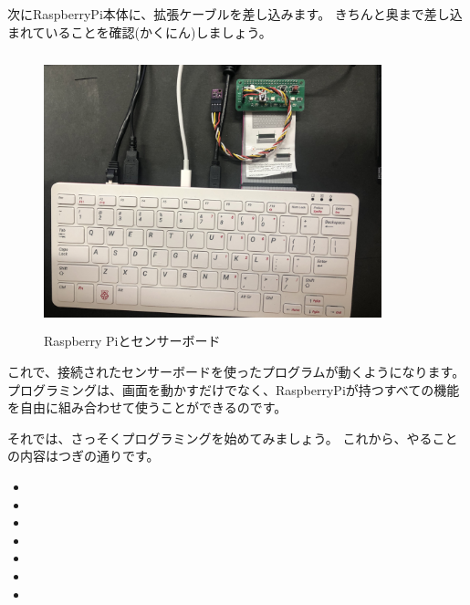 次にRaspberryPi本体に、拡張ケーブルを差し込みます。
きちんと奥まで差し込まれていることを確認(かくにん)しましょう。

\begin{figure}[H]
    \begin{center}
        \includegraphics[keepaspectratio,width=9.79cm,height=7.955cm]{text02-img/sensor4.jpg}
        \caption{Raspberry Piとセンサーボード}
    \end{center}
\end{figure}

これで、接続されたセンサーボードを使ったプログラムが動くようになります。
プログラミングは、画面を動かすだけでなく、RaspberryPiが持つすべての機能を自由に組み合わせて使うことができるのです。

それでは、さっそくプログラミングを始めてみましょう。
これから、やることの内容はつぎの通りです。

\begin{itemize}
    \item {}
    \item {}
    \item {}
    \item {}
    \item {}
    \item {}
    \item {}
\end{itemize}